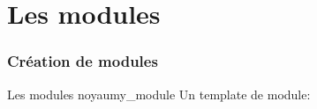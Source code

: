 %
%
%

\part{Les modules}

\begin{frame}
  \partpage
\end{frame}

\begin{frame}
  \tableofcontents[currentpart]
\end{frame}

\section{Création de modules}

\begin{frame}[fragile=singleslide]{Les modules noyau}{my\_module}
  Un template de module:
  
\end{frame}

